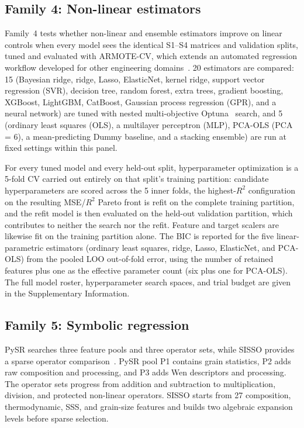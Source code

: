 \documentclass[5p,times,twocolumn]{elsarticle}
\newcommand{\familyfour}{Non-linear estimators}
\newcommand{\familyfive}{Symbolic regression}
\begin{document}
\subsection{Family 4: \familyfour}

Family~4 tests whether non-linear and ensemble estimators improve on linear controls when every model sees the identical S1--S4 matrices and validation splits, tuned and evaluated with ARMOTE-CV, which extends an automated regression workflow developed for other engineering domains~\cite{padhy2025automated,saurabh2026automated}. 20 estimators are compared: 15 (Bayesian ridge, ridge, Lasso, ElasticNet, kernel ridge, support vector regression (SVR), decision tree, random forest, extra trees, gradient boosting, XGBoost, LightGBM, CatBoost, Gaussian process regression (GPR), and a neural network) are tuned with nested multi-objective Optuna~\cite{optuna_2019} search, and 5 (ordinary least squares (OLS), a multilayer perceptron (MLP), PCA-OLS (PCA = 6), a mean-predicting Dummy baseline, and a stacking ensemble) are run at fixed settings within this panel.

For every tuned model and every held-out split, hyperparameter optimization is a 5-fold CV carried out entirely on that split's training partition: candidate hyperparameters are scored across the 5 inner folds, the highest-$R^2$ configuration on the resulting MSE/$R^2$ Pareto front is refit on the complete training partition, and the refit model is then evaluated on the held-out validation partition, which contributes to neither the search nor the refit. Feature and target scalers are likewise fit on the training partition alone. The BIC is reported for the five linear-parametric estimators (ordinary least squares, ridge, Lasso, ElasticNet, and PCA-OLS) from the pooled LOO out-of-fold error, using the number of retained features plus one as the effective parameter count (six plus one for PCA-OLS). The full model roster, hyperparameter search spaces, and trial budget are given in the Supplementary Information.

\subsection{Family 5: \familyfive}

PySR searches three feature pools and three operator sets, while SISSO provides a sparse operator comparison~\cite{Cranmer2023PySR,Ouyang2018SISSO}. PySR pool P1 contains grain statistics, P2 adds raw composition and processing, and P3 adds Wen descriptors and processing. The operator sets progress from addition and subtraction to multiplication, division, and protected non-linear operators. SISSO starts from 27 composition, thermodynamic, SSS, and grain-size features and builds two algebraic expansion levels before sparse selection.
\end{document}
